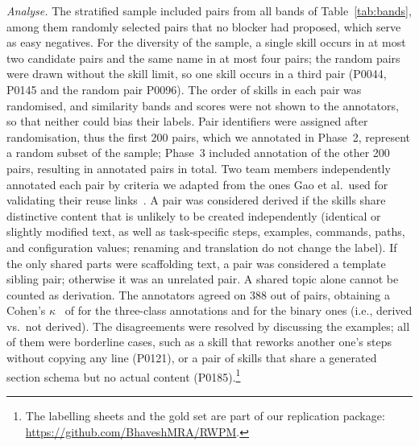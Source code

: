 \documentclass[sigconf,screen]{acmart}
\begin{document}
\emph{Analyse.} The stratified sample included \ResSampleTotal{} pairs from all bands of Table~\ref{tab:bands}, among them \ResSampleSeven{} randomly selected pairs that no blocker had proposed, which serve as easy negatives. For the diversity of the sample, a single skill occurs in at most two candidate pairs and the same name in at most four pairs; the random pairs were drawn without the skill limit, so one skill occurs in a third pair (P0044, P0145 and the random pair P0096). The order of skills in each pair was randomised, and similarity bands and scores were not shown to the annotators, so that neither could bias their labels. Pair identifiers were assigned after randomisation, thus the first 200 pairs, which we annotated in Phase~2, represent a random subset of the sample; Phase~3 included annotation of the other 200 pairs, resulting in \ResGoldPairs{} annotated pairs in total. Two team members independently annotated each pair by criteria we adapted from the ones Gao et al.\ used for validating their reuse links~\cite{gao2026registry}. A pair was considered derived if the skills share distinctive content that is unlikely to be created independently (identical or slightly modified text, as well as task-specific steps, examples, commands, paths, and configuration values; renaming and translation do not change the label). If the only shared parts were scaffolding text, a pair was considered a template sibling pair; otherwise it was an unrelated pair. A shared topic alone cannot be counted as derivation. The annotators agreed on 388 out of \ResGoldPairs{} pairs, obtaining a Cohen's $\kappa$~\cite{cohen1960kappa} of \ResKappaThree{} for the three-class annotations and \ResKappaBin{} for the binary ones (i.e., derived vs.\ not derived). The \ResDisagree{} disagreements were resolved by discussing the examples; all of them were borderline cases, such as a skill that reworks another one's steps without copying any line (P0121), or a pair of skills that share a generated section schema but no actual content (P0185).\footnote{The labelling sheets and the gold set are part of our replication package: \url{https://github.com/BhaveshMRA/RWPM}.}
\end{document}
